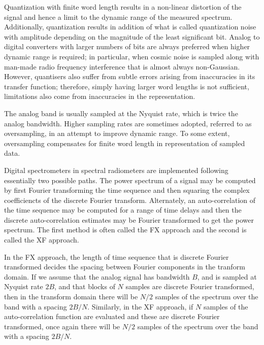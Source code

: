   Quantization with finite word length results in a non-linear distortion of the signal and hence a limit to the dynamic range of the measured spectrum.  Additionally, quantization results in addition of what is called quantization noise with amplitude depending on the magnitude of the least significant bit.  Analog to digital converters with larger numbers of bits are always preferred when higher dynamic range is required; in particular, when cosmic noise is sampled along with man-made radio frequency interference that is almost always non-Gaussian.  However, quantisers also suffer from subtle errors arising from inaccuracies in its transfer function; therefore, simply having larger word lengths is not sufficient, limitations also come from inaccuracies in the representation.
  
  The analog band is usually sampled at the Nyquist rate, which is twice the analog bandwidth.  Higher sampling rates are sometimes adopted, referred to as oversampling, in an attempt to improve dynamic range. To some extent, oversampling compensates for finite word length in representation of sampled data.
  
  Digital spectrometers in spectral radiometers are implemented following essentially two possible paths.  The power spectrum of a signal may be computed by first Fourier transforming the time sequence and then squaring the complex coefficiencts of the discrete Fourier transform.  Alternately, an auto-correlation of the time sequence may be computed for a range of time delays and then the discrete auto-correlation estimates may be Fourier transformed to get the power spectrum. The first method is often called the FX approach and the second is called the XF approach. 
  
  In the FX approach, the length of time sequence that is discrete Fourier transformed decides the spacing between Fourier components in the tranform domain.  If we assume that the analog signal has bandwidth $B$, and is sampled at Nyquist rate $2B$, and that blocks of $N$ samples are discrete Fourier transformed, then in the transform domain there will be $N/2$ samples of the spectrum over the band with a spacing $2B/N$.  Similarly, in the XF approach, if $N$ samples of the auto-correlation function are evaluated and these are discrete Fourier transformed, once again there will be $N/2$ samples of the spectrum over the band with a spacing $2B/N$.
  
